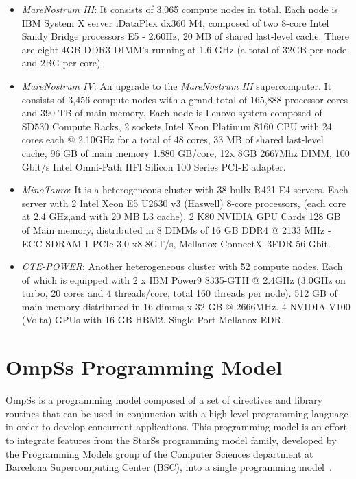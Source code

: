 \begin{itemize}
    \item \textit{MareNostrum III}: It consists of 3,065 compute nodes in total.  
        Each node is IBM System X server iDataPlex dx360 M4, composed of two 
        8-core Intel Sandy Bridge processors E5 - 2.60Hz, 20 MB of shared 
        last-level cache. There are eight 4GB DDR3 DIMM's running at 1.6 GHz (a 
        total of 32GB per node and 2BG per core).
    \item \textit{MareNostrum IV}: An upgrade to the \textit{MareNostrum III} 
        supercomputer. It consists of 3,456 compute nodes with a grand total of 
        165,888
        processor cores and 390 TB of main memory. Each node is Lenovo system 
        composed of SD530 Compute Racks, 2 sockets Intel Xeon Platinum 8160 CPU 
        with 24 cores each @ 2.10GHz for a total of 48 cores, 33 MB of shared 
        last-level cache, 96 GB of main memory 1.880 GB/core, 12x 8GB 2667Mhz 
        DIMM, 100 Gbit/s Intel Omni-Path HFI Silicon 100 Series PCI-E adapter.
    \item \textit{MinoTauro}: It is a heterogeneous cluster with 38 bullx 
        R421-E4 servers. Each server with 2 Intel Xeon E5 U2630 v3 (Haswell) 
        8-core processors, (each core at 2.4 GHz,and with 20 MB L3 cache), 2 K80 
        NVIDIA GPU Cards
        128 GB of Main memory, distributed in 8 DIMMs of 16 GB DDR4 @ 2133 MHz - 
        ECC SDRAM
        1 PCIe 3.0 x8 8GT/s, Mellanox ConnectX~\textregistered 3FDR 56 Gbit.
    \item \textit{CTE-POWER}: Another heterogeneous cluster with 52 compute 
        nodes. Each of which is equipped with 2 x IBM Power9 8335-GTH @ 2.4GHz 
        (3.0GHz on turbo, 20 cores and 4 threads/core, total 160 threads per 
        node).
        512 GB of main memory distributed in 16 dimms x 32 GB @ 2666MHz.  4 
        NVIDIA V100 (Volta) GPUs with 16 GB HBM2. Single Port Mellanox EDR.
\end{itemize}

\section{OmpSs Programming Model}
OmpSs is a programming model composed of a set of directives and library 
routines that can be used in conjunction with a high level programming language 
in order to develop concurrent applications. This programming model is an effort 
to integrate features from the StarSs programming model family, developed by the 
Programming Models group of the Computer Sciences department at Barcelona 
Supercomputing Center (BSC), into a single programming model~\cite{ompss}.

